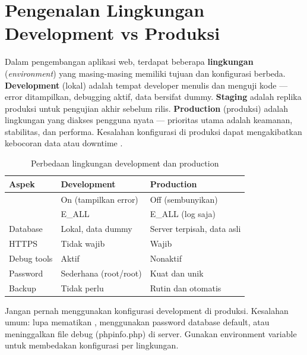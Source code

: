 \section{Pengenalan Lingkungan Development vs Produksi}

Dalam pengembangan aplikasi web, terdapat beberapa \textbf{lingkungan} (\textit{environment}) yang masing-masing memiliki tujuan dan konfigurasi berbeda. \textbf{Development} (lokal) adalah tempat developer menulis dan menguji kode --- error ditampilkan, debugging aktif, data bersifat dummy. \textbf{Staging} adalah replika produksi untuk pengujian akhir sebelum rilis. \textbf{Production} (produksi) adalah lingkungan yang diakses pengguna nyata --- prioritas utama adalah keamanan, stabilitas, dan performa. Kesalahan konfigurasi di produksi dapat mengakibatkan kebocoran data atau downtime \cite{mdnDeploy}.

\begin{table}[ht]
\centering
\begin{tabular}{|P{3cm}|P{4cm}|P{4cm}|}
\hline
\textbf{Aspek} & \textbf{Development} & \textbf{Production} \\
\hline
{} & On (tampilkan error) & Off (sembunyikan) \\
\hline
{} & E\_ALL & E\_ALL (log saja) \\
\hline
Database & Lokal, data dummy & Server terpisah, data asli \\
\hline
HTTPS & Tidak wajib & Wajib \\
\hline
Debug tools & Aktif & Nonaktif \\
\hline
Password & Sederhana (root/root) & Kuat dan unik \\
\hline
Backup & Tidak perlu & Rutin dan otomatis \\
\hline
\end{tabular}
\caption{Perbedaan lingkungan development dan production}
\end{table}

\begin{catatan}
Jangan pernah menggunakan konfigurasi development di produksi. Kesalahan umum: lupa mematikan , menggunakan password database default, atau meninggalkan file debug (phpinfo.php) di server. Gunakan environment variable untuk membedakan konfigurasi per lingkungan.
\end{catatan}

